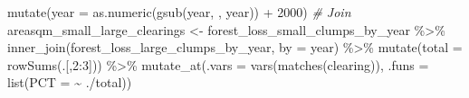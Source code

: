 \documentclass[10pt,landscape,a3paper]{article}
\newenvironment{Shaded}{\begin{snugshade}}{\end{snugshade}}
\newcommand{\AttributeTok}[1]{\textcolor[rgb]{0.77,0.63,0.00}{#1}}
\newcommand{\CommentTok}[1]{\textcolor[rgb]{0.56,0.35,0.01}{\textit{#1}}}
\newcommand{\DecValTok}[1]{\textcolor[rgb]{0.00,0.00,0.81}{#1}}
\newcommand{\FunctionTok}[1]{\textcolor[rgb]{0.00,0.00,0.00}{#1}}
\newcommand{\NormalTok}[1]{#1}
\newcommand{\OtherTok}[1]{\textcolor[rgb]{0.56,0.35,0.01}{#1}}
\newcommand{\SpecialCharTok}[1]{\textcolor[rgb]{0.00,0.00,0.00}{#1}}
\newcommand{\StringTok}[1]{\textcolor[rgb]{0.31,0.60,0.02}{#1}}
\begin{document}
\begin{Shaded}
\begin{Highlighting}[]
  \FunctionTok{mutate}\NormalTok{(}\AttributeTok{year =} \FunctionTok{as.numeric}\NormalTok{(}\FunctionTok{gsub}\NormalTok{(}\StringTok{\textquotesingle{}year\textquotesingle{}}\NormalTok{, }\StringTok{\textquotesingle{}\textquotesingle{}}\NormalTok{, year)) }\SpecialCharTok{+} \DecValTok{2000}\NormalTok{)}
\CommentTok{\# Join}
\NormalTok{areasqm\_small\_large\_clearings }\OtherTok{\textless{}{-}}\NormalTok{ forest\_loss\_small\_clumps\_by\_year }\SpecialCharTok{\%\textgreater{}\%}
  \FunctionTok{inner\_join}\NormalTok{(forest\_loss\_large\_clumps\_by\_year, }\AttributeTok{by =} \StringTok{\textquotesingle{}year\textquotesingle{}}\NormalTok{) }\SpecialCharTok{\%\textgreater{}\%} 
  \FunctionTok{mutate}\NormalTok{(}\AttributeTok{total =} \FunctionTok{rowSums}\NormalTok{(.[,}\DecValTok{2}\SpecialCharTok{:}\DecValTok{3}\NormalTok{])) }\SpecialCharTok{\%\textgreater{}\%}
  \FunctionTok{mutate\_at}\NormalTok{(}\AttributeTok{.vars =} \FunctionTok{vars}\NormalTok{(}\FunctionTok{matches}\NormalTok{(}\StringTok{\textquotesingle{}clearing\textquotesingle{}}\NormalTok{)), }\AttributeTok{.funs =} \FunctionTok{list}\NormalTok{(}\AttributeTok{PCT =} \SpecialCharTok{\textasciitilde{}}\NormalTok{ .}\SpecialCharTok{/}\NormalTok{total))}


\end{Highlighting}
\end{Shaded}
\end{document}
